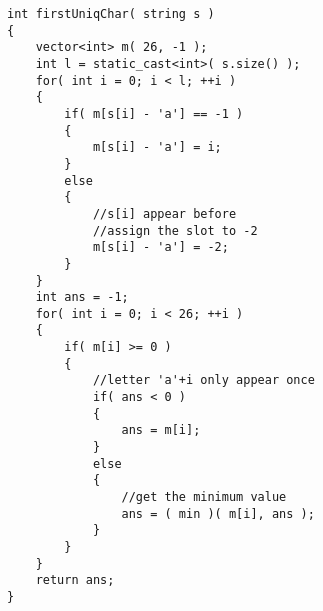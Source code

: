 \setcounter{lstlisting}{0}
\begin{lstlisting}[style=customc, caption={Counter}]
int firstUniqChar( string s )
{
    vector<int> m( 26, -1 );
    int l = static_cast<int>( s.size() );
    for( int i = 0; i < l; ++i )
    {
        if( m[s[i] - 'a'] == -1 )
        {
            m[s[i] - 'a'] = i;
        }
        else
        {
            //s[i] appear before
            //assign the slot to -2
            m[s[i] - 'a'] = -2;
        }
    }
    int ans = -1;
    for( int i = 0; i < 26; ++i )
    {
        if( m[i] >= 0 )
        {
            //letter 'a'+i only appear once
            if( ans < 0 )
            {
                ans = m[i];
            }
            else
            {
                //get the minimum value
                ans = ( min )( m[i], ans );
            }
        }
    }
    return ans;
}
\end{lstlisting}